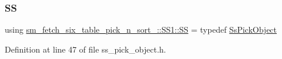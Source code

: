 \subsubsection{\texorpdfstring{SS}{SS}}
{\footnotesize\ttfamily using \hyperlink{namespacesm__fetch__six__table__pick__n__sort__1_1_1SS1_a8d449eae610b682589fcd5ca95d19e96}{sm\+\_\+fetch\+\_\+six\+\_\+table\+\_\+pick\+\_\+n\+\_\+sort\+\_\+::\+S\+S1\+::\+SS} = typedef \hyperlink{structsm__fetch__six__table__pick__n__sort__1_1_1SS1_1_1SsPickObject}{Ss\+Pick\+Object}}



Definition at line 47 of file ss\+\_\+pick\+\_\+object.\+h.

